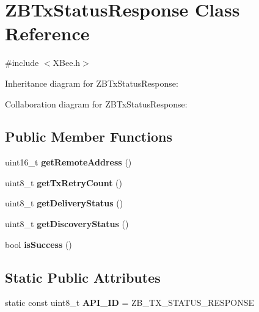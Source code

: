 \hypertarget{class_z_b_tx_status_response}{}\section{Z\+B\+Tx\+Status\+Response Class Reference}
\label{class_z_b_tx_status_response}


{\ttfamily \#include $<$X\+Bee.\+h$>$}



Inheritance diagram for Z\+B\+Tx\+Status\+Response\+:


Collaboration diagram for Z\+B\+Tx\+Status\+Response\+:
\subsection*{Public Member Functions}
\begin{DoxyCompactItemize}
\item 
\hypertarget{class_z_b_tx_status_response_a75043a3c9af5868938de65c2e4eb1196}{}\label{class_z_b_tx_status_response_a75043a3c9af5868938de65c2e4eb1196} 
uint16\+\_\+t {\bfseries get\+Remote\+Address} ()
\item 
\hypertarget{class_z_b_tx_status_response_a84f24560187b275d171f0abca28fe2a4}{}\label{class_z_b_tx_status_response_a84f24560187b275d171f0abca28fe2a4} 
uint8\+\_\+t {\bfseries get\+Tx\+Retry\+Count} ()
\item 
\hypertarget{class_z_b_tx_status_response_ad5b8d8a178e0f8fb69e7f24999c37a26}{}\label{class_z_b_tx_status_response_ad5b8d8a178e0f8fb69e7f24999c37a26} 
uint8\+\_\+t {\bfseries get\+Delivery\+Status} ()
\item 
\hypertarget{class_z_b_tx_status_response_a0a0a3e30c844a032b43e71f2cdcd66b8}{}\label{class_z_b_tx_status_response_a0a0a3e30c844a032b43e71f2cdcd66b8} 
uint8\+\_\+t {\bfseries get\+Discovery\+Status} ()
\item 
\hypertarget{class_z_b_tx_status_response_a3e8472bdc5c2a91a352c75ab327dcccc}{}\label{class_z_b_tx_status_response_a3e8472bdc5c2a91a352c75ab327dcccc} 
bool {\bfseries is\+Success} ()
\end{DoxyCompactItemize}
\subsection*{Static Public Attributes}
\begin{DoxyCompactItemize}
\item 
\hypertarget{class_z_b_tx_status_response_a6e767318e381cf55e13fa83a071bef5b}{}\label{class_z_b_tx_status_response_a6e767318e381cf55e13fa83a071bef5b} 
static const uint8\+\_\+t {\bfseries A\+P\+I\+\_\+\+ID} = Z\+B\+\_\+\+T\+X\+\_\+\+S\+T\+A\+T\+U\+S\+\_\+\+R\+E\+S\+P\+O\+N\+SE
\end{DoxyCompactItemize}
